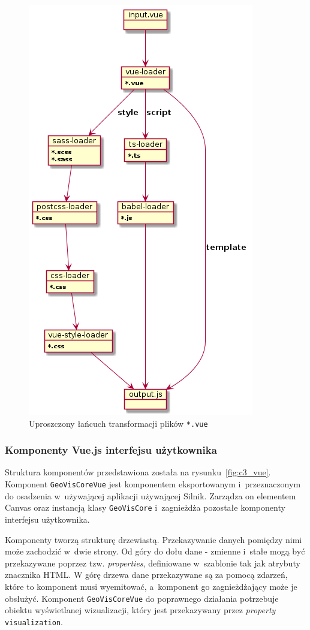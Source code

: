 \begin{figure}
    \centering
    \includegraphics[scale=0.6]{diagrams/out/c3_webpack.png}
    \caption{Uproszczony łańcuch transformacji plików \texttt{*.vue}}
    \label{fig:c3_webpack}
\end{figure}

\subsubsection{Komponenty Vue.js interfejsu użytkownika}

Struktura komponentów przedstawiona została na rysunku~\ref{fig:c3_vue}. Komponent \texttt{GeoVisCoreVue} jest komponentem eksportowanym i~przeznaczonym do osadzenia w~używającej aplikacji używającej Silnik. Zarządza on elementem Canvas oraz instancją klasy \texttt{GeoVisCore} i~zagnieżdża pozostałe komponenty interfejsu użytkownika.

Komponenty tworzą strukturę drzewiastą. Przekazywanie danych pomiędzy nimi może zachodzić w~dwie strony. Od góry do dołu dane - zmienne i~stałe mogą być przekazywane poprzez tzw. \textit{properties}, definiowane w~szablonie tak jak atrybuty znacznika HTML. W górę drzewa dane przekazywane są za pomocą zdarzeń, które to komponent musi wyemitować, a~komponent go zagnieżdżający może je obsłużyć. Komponent \texttt{GeoVisCoreVue} do poprawnego działania potrzebuje obiektu wyświetlanej wizualizacji, który jest przekazywany przez \textit{property} \texttt{visualization}.


